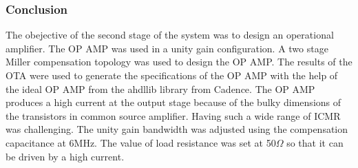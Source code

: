 \subsubsection{Conclusion}
The obejective of the second stage of the system was to design an operational amplifier. The OP AMP was used in a unity gain configuration. A two stage Miller compensation topology was used to design the OP AMP. The results of the OTA were used to generate the specifications of the OP AMP with the help of the ideal OP AMP from the ahdllib library from Cadence. The OP AMP produces a high current at the output stage because of the bulky dimensions of the transistors in common source amplifier. Having such a wide range of ICMR was challenging. The unity gain bandwidth was adjusted using the compensation capacitance at 6MHz. The value of load resistance was set at 50$\Omega$ so that it can be driven by a high current.